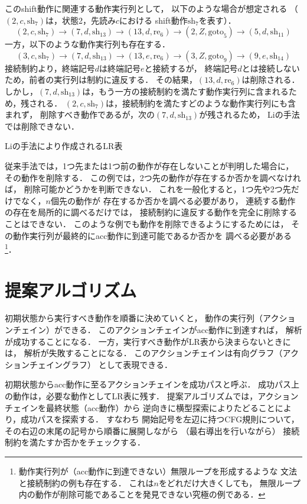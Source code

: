 \documentclass[japanese]{jnlp_1.4}
\begin{document}
このshift動作に関連する動作実行列として，
以下のような場合が想定される
（$(2,c,\mathrm{sh}_7)$は，状態2，先読み$c$における
shift動作$\mathrm{sh}_7$を表す）．
\[
  (2,c,\mathrm{sh}_7) \to (7,d,\mathrm{sh}_{13}) \to (13,d,\mathrm{re}_6) \to (2, Z, \mathrm{goto}_5) \to (5,d,\mathrm{sh}_{11})
\]
一方，以下のような動作実行列も存在する．
\[
  (3,c,\mathrm{sh}_7) \to (7,d,\mathrm{sh}_{13}) \to (13,e,\mathrm{re}_6) \to (3, Z, \mathrm{goto}_9) \to (9,e,\mathrm{sh}_{14})
\]
接続制約より，終端記号$d$は終端記号$e$と接続するが，
終端記号$d$とは接続しないため，前者の実行列は制約に違反する．
その結果，$(13,d,\mathrm{re}_6)$は削除される．
しかし，$(7,d,\mathrm{sh}_{13})$は，もう一方の接続制約を満たす動作実行列に含まれるため，残される．
$(2,c,\mathrm{sh}_7)$は，接続制約を満たすどのような動作実行列にも含まれず，
削除すべき動作であるが，次の$(7,d,\mathrm{sh}_{13})$が残されるため，
Liの手法では削除できない．

\begin{table}[t]
  \caption{Liの手法により作成されるLR表}
  \label{tab:lr_table_hashimoto}

\end{table}

従来手法では，1つ先または1つ前の動作が存在しないことが判明した場合に，
その動作を削除する．
この例では，2つ先の動作が存在するか否かを調べなければ，
削除可能かどうかを判断できない．
これを一般化すると，1つ先や2つ先だけでなく，$n$個先の動作が
存在するか否かを調べる必要があり，
連続する動作の存在を局所的に調べるだけでは，
接続制約に違反する動作を完全に削除することはできない．
このような例でも動作を削除できるようにするためには，
その動作実行列が最終的にacc動作に到達可能であるか否かを
調べる必要がある
\footnote{動作実行列が（acc動作に到達できない）無限ループを形成するような
  文法と接続制約の例も存在する．
  これは$n$をどれだけ大きくしても，
  無限ループ内の動作が削除可能であることを発見できない究極の例である．}．


\section{提案アルゴリズム}
\label{sec:improvement}

初期状態から実行すべき動作を順番に決めていくと，
動作の実行列（アクションチェイン）ができる．
このアクションチェインがacc動作に到達すれば，
解析が成功することになる．
一方，実行すべき動作がLR表から決まらないときには，
解析が失敗することになる．
このアクションチェインは有向グラフ（アクションチェイングラフ） として表現できる．

初期状態からacc動作に至るアクションチェインを成功パスと呼ぶ．
成功パス上の動作は，必要な動作としてLR表に残す．
提案アルゴリズムでは，アクションチェインを最終状態（acc動作）から
逆向きに横型探索によりたどることにより，成功パスを探索する．
すなわち
開始記号を左辺に持つCFG規則について，
その右辺の末尾の記号から順番に展開しながら
（最右導出を行いながら）
接続制約を満たすか否かをチェックする．
\end{document}
